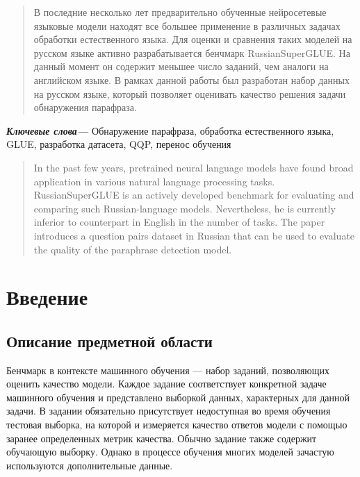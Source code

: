 \documentclass[a4paper,14pt]{extarticle}
\begin{document}
\newpage

{
	\hypersetup{linkcolor=black}
	\tableofcontents
}

\newpage
{}
\begin{abstract}
    В последние несколько лет предварительно обученные нейросетевые языковые модели находят все большее применение в различных задачах обработки естественного языка.
    Для оценки и сравнения таких моделей на русском языке активно разрабатывается бенчмарк RussianSuperGLUE.
    На данный момент он содержит меньшее число заданий, чем аналоги на английском языке.
    В рамках данной работы был разработан набор данных на русском языке, который позволяет оценивать качество решения задачи обнаружения парафраза.
\end{abstract}
\textbf{\textit{Ключевые слова---}} Обнаружение парафраза, обработка естественного языка, GLUE, разработка датасета, QQP, перенос обучения
    
\begin{abstract}
    In the past few years, pretrained neural language models have found broad application in various natural language processing tasks.
    RussianSuperGLUE is an actively developed benchmark for evaluating and comparing such Russian-language models.
    Nevertheless, he is currently inferior to counterpart in English in the number of tasks.
    The paper introduces a question pairs dataset in Russian that can be used to evaluate the quality of the paraphrase detection model.
\end{abstract}

\section{Введение}
\subsection{Описание предметной области}
Бенчмарк в контексте машинного обучения — набор заданий, позволяющих оценить качество модели.
Каждое задание соответствует конкретной задаче машинного обучения и представлено выборкой данных, характерных для данной задачи.
В задании обязательно присутствует недоступная во время обучения тестовая выборка, на которой и измеряется качество ответов модели с помощью заранее определенных метрик качества.
Обычно задание также содержит обучающую выборку.
Однако в процессе обучения многих моделей зачастую используются дополнительные данные.
\end{document}
